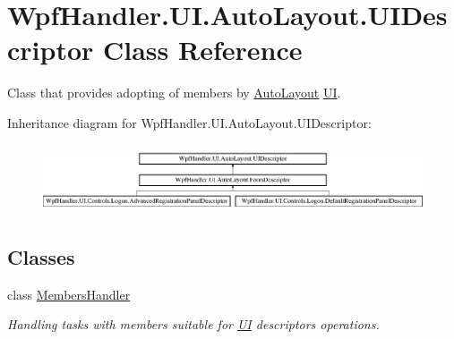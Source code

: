 \hypertarget{class_wpf_handler_1_1_u_i_1_1_auto_layout_1_1_u_i_descriptor}{}\section{Wpf\+Handler.\+U\+I.\+Auto\+Layout.\+U\+I\+Descriptor Class Reference}
\label{class_wpf_handler_1_1_u_i_1_1_auto_layout_1_1_u_i_descriptor}


Class that provides adopting of members by \mbox{\hyperlink{namespace_wpf_handler_1_1_u_i_1_1_auto_layout}{Auto\+Layout}} \mbox{\hyperlink{namespace_wpf_handler_1_1_u_i}{UI}}.  


Inheritance diagram for Wpf\+Handler.\+U\+I.\+Auto\+Layout.\+U\+I\+Descriptor\+:\begin{figure}[H]
\begin{center}
\leavevmode
\includegraphics[height=2.043796cm]{d1/d72/class_wpf_handler_1_1_u_i_1_1_auto_layout_1_1_u_i_descriptor}
\end{center}
\end{figure}
\subsection*{Classes}
\begin{DoxyCompactItemize}
\item 
class \mbox{\hyperlink{class_wpf_handler_1_1_u_i_1_1_auto_layout_1_1_u_i_descriptor_1_1_members_handler}{Members\+Handler}}
\begin{DoxyCompactList}\small\item\em Handling tasks with members suitable for \mbox{\hyperlink{namespace_wpf_handler_1_1_u_i}{UI}} descriptor\textquotesingle{}s operations. \end{DoxyCompactList}\end{DoxyCompactItemize}
